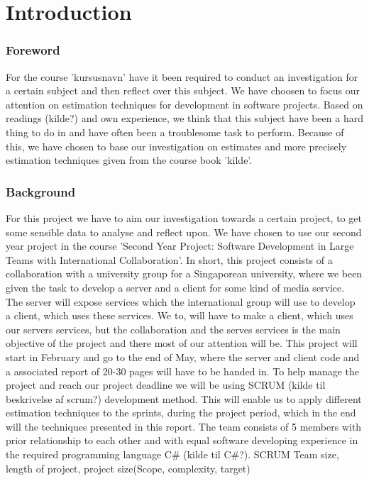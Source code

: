 \part{Introduction}
\section{Foreword}
For the course 'kursusnavn' have it been required to conduct an investigation for a certain subject and then reflect over this subject. We have choosen to focus our attention on estimation techniques for development in software projects. Based on readings (kilde?) and own experience, we think that this subject have been a hard thing to do in and have often been a  troublesome task to perform. Because of this, we have chosen to base our investigation on estimates and more precisely estimation techniques given from the course book 'kilde'. 

\section{Background}
For this project we have to aim our investigation towards a certain project, to get some sensible data to analyse and reflect upon. We have chosen to use our second year project in the course 'Second Year Project: Software Development in Large Teams with International Collaboration'. In short, this project consists of a collaboration with a university group for a Singaporean university, where we been given the task to develop a server and a client for some kind of media service. The server will expose services which the international group will use to develop a client, which uses these services. We to, will have to make a client, which uses our servers services, but the collaboration and the serves services is the main objective of the project and there most of our attention will be. This project will start in February and go to the end of May, where the server and client code and a associated report of 20-30 pages will have to be handed in. To help manage the project and reach our project deadline we will be using SCRUM (kilde til beskrivelse af scrum?) development method. This will enable us to apply different estimation techniques to the sprints, during the project period, which in the end will the techniques presented in this report. The team consists of 5 members with prior relationship to each other and with equal software developing experience in the required programming language C\# (kilde til C\#?). 
SCRUM
Team size, length of project, project size(Scope, complexity, target)


